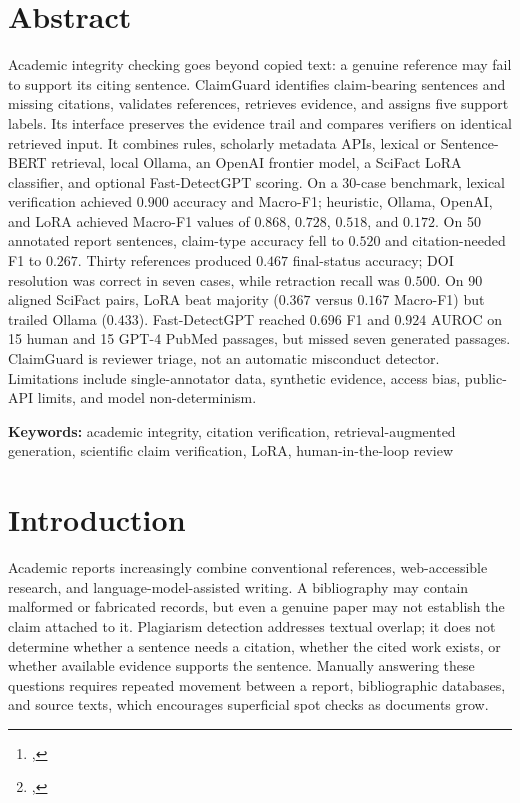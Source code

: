 \documentclass[12pt,toc=bib,toc=listof]{scrartcl}
\title{\reprttopic}
\author{
  \reprtstudentname\footnote{\reprtstudentid, \reprtstudentmail} \and
  \reprtstudentnameB\footnote{\reprtstudentidB, \reprtstudentmailB}
}
\begin{document}
\maketitle

\newpage
{}
\onehalfspacing

\section{Abstract}

Academic integrity checking goes beyond copied text: a genuine reference may fail to support its citing sentence. ClaimGuard identifies claim-bearing sentences and missing citations, validates references, retrieves evidence, and assigns five support labels. Its interface preserves the evidence trail and compares verifiers on identical retrieved input. It combines rules, scholarly metadata APIs, lexical or Sentence-BERT retrieval, local Ollama, an OpenAI frontier model, a SciFact LoRA classifier, and optional Fast-DetectGPT scoring. On a 30-case benchmark, lexical verification achieved $0.900$ accuracy and Macro-F1; heuristic, Ollama, OpenAI, and LoRA achieved Macro-F1 values of $0.868$, $0.728$, $0.518$, and $0.172$. On 50 annotated report sentences, claim-type accuracy fell to $0.520$ and citation-needed F1 to $0.267$. Thirty references produced $0.467$ final-status accuracy; DOI resolution was correct in seven cases, while retraction recall was $0.500$. On 90 aligned SciFact pairs, LoRA beat majority ($0.367$ versus $0.167$ Macro-F1) but trailed Ollama ($0.433$). Fast-DetectGPT reached $0.696$ F1 and $0.924$ AUROC on 15 human and 15 GPT-4 PubMed passages, but missed seven generated passages. ClaimGuard is reviewer triage, not an automatic misconduct detector. Limitations include single-annotator data, synthetic evidence, access bias, public-API limits, and model non-determinism.

\textbf{Keywords:} academic integrity, citation verification, retrieval-augmented generation, scientific claim verification, LoRA, human-in-the-loop review

\section{Introduction}

Academic reports increasingly combine conventional references, web-accessible research, and language-model-assisted writing. A bibliography may contain malformed or fabricated records, but even a genuine paper may not establish the claim attached to it. Plagiarism detection addresses textual overlap; it does not determine whether a sentence needs a citation, whether the cited work exists, or whether available evidence supports the sentence. Manually answering these questions requires repeated movement between a report, bibliographic databases, and source texts, which encourages superficial spot checks as documents grow.
\end{document}
